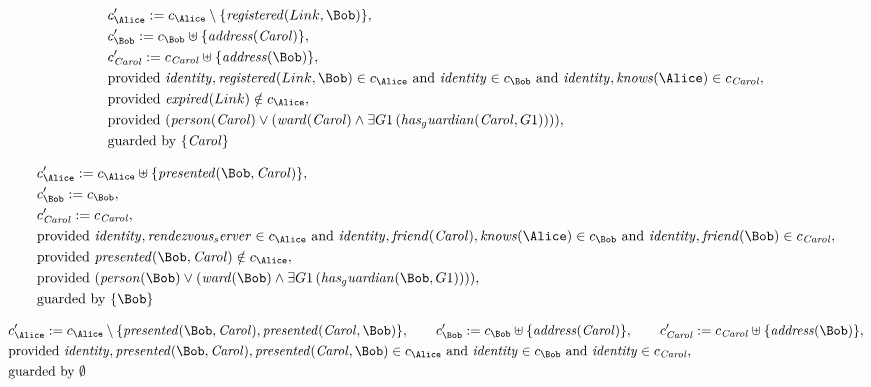 \begin{align*}
&
c'_
{
\Alice
}
 := 
c_
{
\Alice
}
 \setminus 
\{
\mathit{
registered
}
(
Link
,
\Bob
)
\}
,\\
&
c'_
{
\Bob
}
 := 
c_
{
\Bob
}
 \uplus 
\{
\mathit{
address
}
(
\mathit{Carol}
)
\}
,\\
&
c'_
{
\mathit{Carol}
}
 := 
c_
{
\mathit{Carol}
}
 \uplus 
\{
\mathit{
address
}
(
\Bob
)
\}
,\\
&
\text{provided } 
\mathit{
identity
}
,
\mathit{
registered
}
(
Link
,
\Bob
)
 \in c_
{
\Alice
}
 \text{ and } 
\mathit{
identity
}
 \in c_
{
\Bob
}
 \text{ and } 
\mathit{
identity
}
,
\mathit{
knows
}
(
\Alice
)
 \in c_
{
\mathit{Carol}
}
,\\
&
\text{provided } 
\mathit{
expired
}
(
Link
)
 \notin c_
{
\Alice
}
,\\
&
\text{provided } 
(
\mathit{
person
}
(
\mathit{Carol}
)
\lor
(
\mathit{
ward
}
(
\mathit{Carol}
)
\land
\exists 
G1
\,(
\mathit{
has_guardian
}
(
\mathit{Carol}
,
G1
)
)
)
)
,\\
&
\text{guarded by } \{
\mathit{Carol}
\}
\end{align*}

\begin{align*}
&
c'_
{
\Alice
}
 := 
c_
{
\Alice
}
 \uplus 
\{
\mathit{
presented
}
(
\Bob
,
\mathit{Carol}
)
\}
,\\
&
c'_
{
\Bob
}
 := 
c_
{
\Bob
}
,\\
&
c'_
{
\mathit{Carol}
}
 := 
c_
{
\mathit{Carol}
}
,\\
&
\text{provided } 
\mathit{
identity
}
,
\mathit{
rendezvous_server
}
 \in c_
{
\Alice
}
 \text{ and } 
\mathit{
identity
}
,
\mathit{
friend
}
(
\mathit{Carol}
)
,
\mathit{
knows
}
(
\Alice
)
 \in c_
{
\Bob
}
 \text{ and } 
\mathit{
identity
}
,
\mathit{
friend
}
(
\Bob
)
 \in c_
{
\mathit{Carol}
}
,\\
&
\text{provided } 
\mathit{
presented
}
(
\Bob
,
\mathit{Carol}
)
 \notin c_
{
\Alice
}
,\\
&
\text{provided } 
(
\mathit{
person
}
(
\Bob
)
\lor
(
\mathit{
ward
}
(
\Bob
)
\land
\exists 
G1
\,(
\mathit{
has_guardian
}
(
\Bob
,
G1
)
)
)
)
,\\
&
\text{guarded by } \{
\Bob
\}
\end{align*}

\begin{align*}
&
c'_
{
\Alice
}
 := 
c_
{
\Alice
}
 \setminus 
\{
\mathit{
presented
}
(
\Bob
,
\mathit{Carol}
)
,
\mathit{
presented
}
(
\mathit{Carol}
,
\Bob
)
\}
, \qquad 
c'_
{
\Bob
}
 := 
c_
{
\Bob
}
 \uplus 
\{
\mathit{
address
}
(
\mathit{Carol}
)
\}
, \qquad 
c'_
{
\mathit{Carol}
}
 := 
c_
{
\mathit{Carol}
}
 \uplus 
\{
\mathit{
address
}
(
\Bob
)
\}
,\\
&
\text{provided } 
\mathit{
identity
}
,
\mathit{
presented
}
(
\Bob
,
\mathit{Carol}
)
,
\mathit{
presented
}
(
\mathit{Carol}
,
\Bob
)
 \in c_
{
\Alice
}
 \text{ and } 
\mathit{
identity
}
 \in c_
{
\Bob
}
 \text{ and } 
\mathit{
identity
}
 \in c_
{
\mathit{Carol}
}
,\\
&
\text{guarded by } \emptyset
\end{align*}
